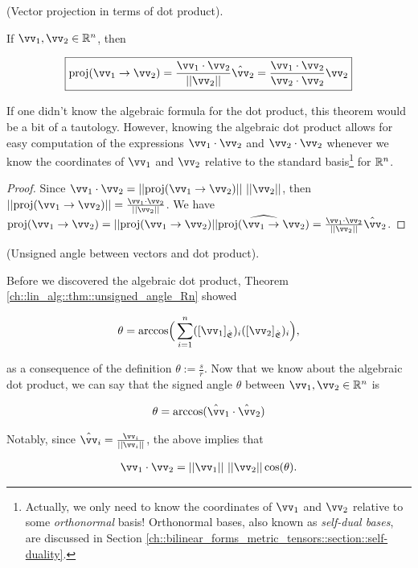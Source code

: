 \begin{theorem}
\label{ch::lin_alg::thm::vector_proj_dot_product}
    (Vector projection in terms of dot product).
    
    If $\vv_1, \vv_2 \in \R^n$, then
    
    \begin{align*}
        \boxed
        {
            \proj(\vv_1 \rightarrow \vv_2) = \frac{\vv_1 \cdot \vv_2}{||\vv_2||} \hat{\vv}_2 = \frac{\vv_1 \cdot \vv_2}{\vv_2 \cdot \vv_2} \vv_2
        }
    \end{align*}
    
    If one didn't know the algebraic formula for the dot product, this theorem would be a bit of a tautology. However, knowing the algebraic dot product allows for easy computation of the expressions $\vv_1 \cdot \vv_2$ and $\vv_2 \cdot \vv_2$ whenever we know the coordinates of $\vv_1$ and $\vv_2$ relative to the standard basis\footnote{Actually, we only need to know the coordinates of $\vv_1$ and $\vv_2$ relative to some \textit{orthonormal} basis! Orthonormal bases, also known as \textit{self-dual bases}, are discussed in Section \ref{ch::bilinear_forms_metric_tensors::section::self-duality}.} for $\mathbb{R}^n$.
\end{theorem}

\begin{proof}
   Since $\vv_1 \cdot \vv_2 = ||\proj(\vv_1 \rightarrow \vv_2)|| \spc ||\vv_2||$, then $||\proj(\vv_1 \rightarrow \vv_2)|| = \frac{\vv_1 \cdot \vv_2}{||\vv_2||}$. We have $\proj(\vv_1 \rightarrow \vv_2) = ||\proj(\vv_1 \rightarrow \vv_2)|| \widehat{\proj(\vv_1 \rightarrow \vv_2)} = \frac{\vv_1 \cdot \vv_2}{||\vv_2||} \hat{\vv}_2$.
\end{proof}

\begin{theorem}
\label{ch::lin_alg::thm::dot_prod_and_angle}
    (Unsigned angle between vectors and dot product).
    
    Before we discovered the algebraic dot product, Theorem \ref{ch::lin_alg::thm::unsigned_angle_Rn} showed 
    
    \begin{align*}
        \theta = \text{arccos}\Big(\sum_{i = 1}^n ([\vv_1]_\sE)_i ([\vv_2]_\sE)_i\Big),
    \end{align*}
    
    as a consequence of the definition $\theta := \frac{s}{r}$. Now that we know about the algebraic dot product, we can say that the signed angle $\theta$ between $\vv_1, \vv_2 \in \R^n$ is
    
    \begin{align*}
        \theta = \text{arccos}(\hat{\vv}_1 \cdot \hat{\vv}_2)
    \end{align*}
    
    Notably, since  $\hat{\vv}_i = \frac{\vv_i}{||\vv_i||}$, the above implies that
    
    \begin{align*}
        \vv_1 \cdot \vv_2 = ||\vv_1|| \spc ||\vv_2|| \cos(\theta).
    \end{align*}
\end{theorem}

